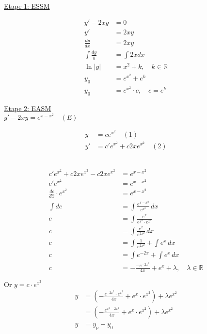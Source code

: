 \underline{Etape 1: ESSM}

\begin{align*}
	y' - 2xy &= 0 \\
	y' &= 2xy \\
	\frac{dy}{dx} &= 2xy \\
	\int \frac{dy}{y} &= \int 2xdx \\
	\ln|y| &= x^2 + k, \quad k \in \mathbb{R} \\
	y_0 &= e^{x^2} + e^k \\
	y_0 &= e^{x^2} \cdot c, \quad c = e^k
\end{align*}

\underline{Etape 2: EASM} \\
$y' - 2xy = e^{x-x^2} \quad (E) $ \\

\begin{align*}
	y &= ce^{x^2} \quad (1) \\
	y' &= c'e^{x^2} + c2xe^{x^2} \quad (2)
\end{align*}

 \\
\begin{align*}
	c'e^{x^2} + c2xe^{x^2} - c2xe^{x^2} &= e^{x - x^2} \\
	c'e^{x^2} &= e^{x-x^2} \\
	\frac{dc}{dx} \cdot e^{x^2} &= e^{x - x^2} \\
	\int dc &= \int \frac{e^{x - x^2}}{e^{x^2}} \, dx \\
	c &= \int \frac{e^x}{e^{x^2} \cdot e^{x^2}} \\
	c &= \int \frac{e^x}{e^{2x^2}} \, dx \\
	c &= \int \frac{1}{e^{2x^2}} + \int e^x \, dx \\
	c &= \int e^{-2x} + \int e^x \, dx \\
	c &= - \frac{-e^{-2x^2}}{4x} + e^x + \lambda, \quad \lambda \in \mathbb{R}
\end{align*}

$\text{Or } y = c \cdot e^{x^2}$ \\
\begin{align*}
	y &= ( - \frac{e^{-2x^2} \cdot e^{x^2}}{4x} + e^x \cdot e^{x^2} )  + \lambda e^{x^2} \\
	&= ( - \frac{e^{x^2 - 2x^2}}{4x} + e^x \cdot e^{x^2} )  + \lambda e^{x^2} \\
	y &= y_p + y_0
\end{align*}
